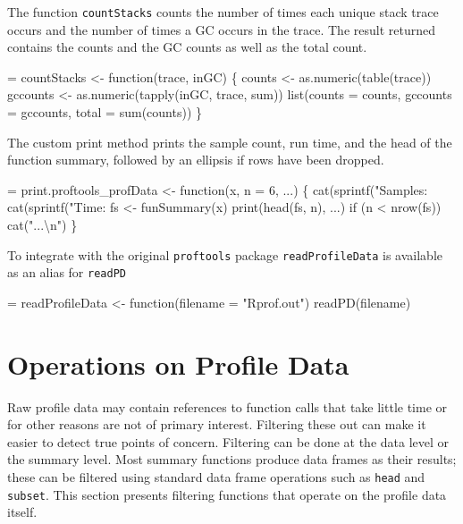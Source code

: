 \documentclass[11pt]{article}
\begin{document}
The function \Verb!countStacks! counts the number of times each unique
stack trace occurs and the number of times a GC occurs in the trace.
The result returned contains the counts and the GC counts as well as
the total count.
\begin{nwchunk}
=
 countStacks <- function(trace, inGC) \{
     counts <- as.numeric(table(trace))
     gccounts <- as.numeric(tapply(inGC, trace, sum))
     list(counts = counts, gccounts = gccounts, total = sum(counts))
 \}
\end{nwchunk}

The custom print method prints the sample count, run time, and the
head of the function summary, followed by an ellipsis if rows have
been dropped.
\begin{nwchunk}
=
 print.proftools_profData <- function(x, n = 6, ...) \{
     cat(sprintf("Samples: %
     cat(sprintf("Time:    %
     fs <- funSummary(x)
     print(head(fs, n), ...)
     if (n < nrow(fs)) cat("...{\textbackslash}n")
 \}
\end{nwchunk}

To integrate with the original \texttt{proftools} package
\Verb!readProfileData! is available as an alias for \Verb?readPD?
\begin{nwchunk}
=
 readProfileData <- function(filename = "Rprof.out")
     readPD(filename)
\end{nwchunk}


\section{Operations on Profile Data}
Raw profile data may contain references to function calls that take
little time or for other reasons are not of primary
interest. Filtering these out can make it easier to detect true points
of concern. Filtering can be done at the data level or the summary
level. Most summary functions produce data frames as their results;
these can be filtered using standard data frame operations such as
\Verb!head! and \Verb?subset?.  This section presents filtering functions
that operate on the profile data itself.
\end{document}
